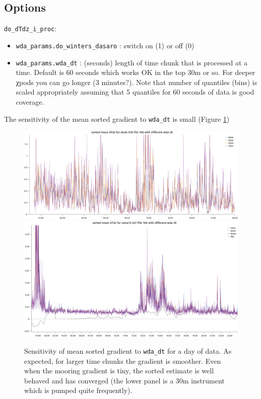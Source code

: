 \subsection{Options}
\texttt{do\_dTdz\_i\_proc}:
\begin{itemize}
\item
  \texttt{wda\_params.do\_winters\_dasaro} : switch on (1) or off (0)
\item
  \texttt{wda\_params.wda\_dt} : (seconds) length of time chunk that is processed at a time. Default is 60 seconds which works OK in the top 30m or so. For deeper χpods you can go longer (3 minutes?). Note that number of quantiles (bins) is scaled appropriately assuming that 5 quantiles for 60 seconds of data is good coverage.
\end{itemize}

The sensitivity of the mean sorted gradient to \texttt{wda\_dt} is small (Figure \ref{fig:sorted-tz-sensitivity})

\begin{figure}
  \centering
  \includegraphics[width=\textwidth]{figs/wda-sorted-dTdz-dt-variation.png}
  \includegraphics[width=\textwidth]{figs/wda-527-file100-sorted-dTdz.png}
  \caption{Sensitivity of mean sorted gradient to \texttt{wda\_dt} for a day of data. As expected, for larger time chunks the gradient is smoother. Even when the mooring gradient is tiny, the sorted estimate is well behaved and has converged (the lower panel is a 30m instrument which is pumped quite frequently).}
  \label{fig:sorted-tz-sensitivity}
\end{figure}

